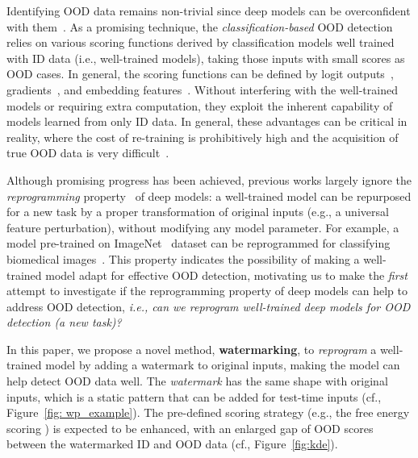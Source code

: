 \documentclass{article}
\begin{document}
Identifying OOD data remains non-trivial since deep models can be overconfident with them~\cite{nguyen2015deep}. As a promising technique, the \emph{classification-based} OOD detection~\cite{yang2021generalized} relies on various scoring functions derived by classification models well trained with ID data (i.e., well-trained models), taking those inputs with small scores as OOD cases. In general, the scoring functions can be defined by logit outputs~\cite{hendrycks2016baseline,liu2020energy}, gradients~\cite{huang2021importance}, and embedding features~\cite{lee2018simple,sastry2019detecting}. Without interfering with the well-trained models or requiring extra computation, they exploit the inherent capability of models learned from only ID data. In general, these advantages can be critical in reality, where the cost of re-training is prohibitively high and the acquisition of true OOD data is very difficult~\cite{yang2021generalized}. 







Although promising progress has been achieved, previous works largely ignore the \emph{reprogramming} property~\cite{elsayed2018adversarial} of deep models: a well-trained model can be repurposed for a new task by a proper transformation of original inputs (e.g., a universal feature perturbation), without modifying any model parameter. For example, a model pre-trained on ImageNet~\cite{deng2009imagenet} dataset can be reprogrammed for classifying biomedical images~\cite{TsaiCH20}.
This property indicates the possibility of making a well-trained model adapt for effective OOD detection, motivating us to make the \emph{first} attempt to investigate if the reprogramming property of deep models can help to address OOD detection, \emph{i.e., can we reprogram well-trained deep models for OOD detection (a new task)?}




In this paper, we propose a novel method, \textbf{watermarking}, to \emph{reprogram} a well-trained model by adding a watermark to original inputs, making the model can help detect OOD data well. The \emph{watermark} has the same shape with original inputs, which is a static pattern that can be added for test-time inputs (cf., Figure~\ref{fig: wp_example}). The pre-defined scoring strategy (e.g., the free energy scoring \cite{liu2020energy}) is expected to be enhanced, with an enlarged gap of OOD scores between the watermarked ID and OOD data (cf., Figure~\ref{fig:kde}). 
\end{document}

